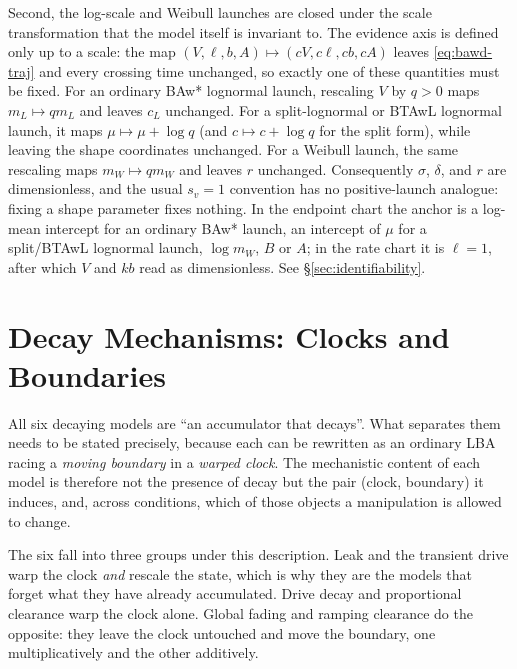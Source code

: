 \documentclass[12pt]{article}
\theoremstyle{remark}
\begin{document}
Second, the log-scale and Weibull launches are closed under the scale transformation that the model itself is invariant to. The evidence axis is defined only up to a scale: the map $(V, \ell, b, A) \mapsto (cV, c\ell, cb, cA)$ leaves
\eqref{eq:bawd-traj} and every crossing time unchanged, so exactly one of these
quantities must be fixed. For an ordinary BAw* lognormal launch, rescaling $V$ by $q>0$ maps $m_L\mapsto q m_L$ and leaves $c_L$ unchanged. For a split-lognormal or BTAwL lognormal launch, it maps $\mu\mapsto\mu+\log q$ (and $c\mapsto c+\log q$ for the split form), while leaving the shape coordinates unchanged. For a Weibull launch, the same rescaling maps $m_W\mapsto q m_W$ and leaves $r$ unchanged. Consequently $\sigma$, $\delta$, and $r$ are dimensionless, and the usual $s_v = 1$ convention has no positive-launch analogue: fixing a shape parameter fixes nothing. In the endpoint chart the anchor is a log-mean intercept for an ordinary BAw* launch, an intercept of $\mu$ for a split/BTAwL lognormal launch, $\log m_W$, $B$ or $A$; in the rate chart it is $\ell=1$, after which $V$ and $kb$ read as dimensionless. See \S\ref{sec:identifiability}.

\section{Decay Mechanisms: Clocks and Boundaries}
\label{sec:clocks}
All six decaying models are ``an accumulator that decays''. What separates them needs to be stated precisely, because each can be rewritten as an ordinary LBA racing a \emph{moving boundary} in a \emph{warped clock}. The mechanistic content of each model is therefore not the presence of decay but the pair (clock, boundary) it induces, and, across conditions, which of those objects a manipulation is allowed to change.

The six fall into three groups under this description. Leak and the transient drive warp the clock \emph{and} rescale the state, which is why they are the models that forget what they have already accumulated. Drive decay and proportional clearance warp the clock alone. Global fading and ramping clearance do the opposite: they leave the clock untouched and move the boundary, one multiplicatively and the other additively.
\end{document}
